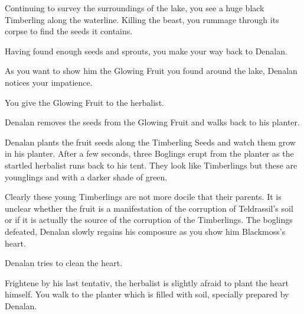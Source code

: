 Continuing to survey the surroundings of the lake, you see a huge black Timberling along the waterline. Killing the beast, you rummage through its corpse to find the seeds it contains.


Having found enough seeds and sprouts, you make your way back to Denalan.



As you want to show him the Glowing Fruit you found around the lake, Denalan notices your impatience.


You give the Glowing Fruit to the herbalist.


Denalan removes the seeds from the Glowing Fruit and walks back to his planter.


Denalan plants the fruit seeds along the Timberling Seeds and watch them grow in his planter. After a few seconds, three Boglings erupt from the planter as the startled herbalist runs back to his tent. They look like Timberlings but these are younglings and with a darker shade of green.


Clearly these young Timberlings are not more docile that their parents. It is unclear whether the fruit is a manifestation of the corruption of Teldrassil's soil or if it is actually the source of the corruption of the Timberlings. The boglings defeated, Denalan slowly regains his composure as you show him Blackmoss's heart.


Denalan tries to clean the heart.


Frightene by his last tentativ, the herbalist is slightly afraid to plant the heart himself. You walk to the planter which is filled with soil, specially prepared by Denalan.  %

